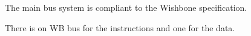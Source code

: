 The main bus system is compliant to the Wishbone specification.

There is on WB bus for the instructions and one for the data.